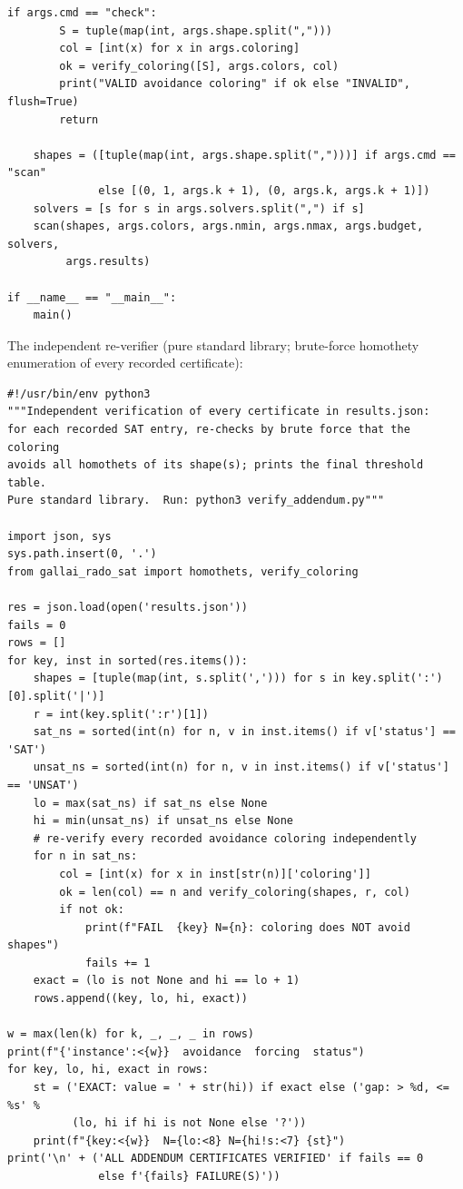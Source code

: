 \documentclass[12pt]{article}
\begin{document}
\begin{lstlisting}[style=plainstyle]
    if args.cmd == "check":
        S = tuple(map(int, args.shape.split(",")))
        col = [int(x) for x in args.coloring]
        ok = verify_coloring([S], args.colors, col)
        print("VALID avoidance coloring" if ok else "INVALID", flush=True)
        return

    shapes = ([tuple(map(int, args.shape.split(",")))] if args.cmd == "scan"
              else [(0, 1, args.k + 1), (0, args.k, args.k + 1)])
    solvers = [s for s in args.solvers.split(",") if s]
    scan(shapes, args.colors, args.nmin, args.nmax, args.budget, solvers,
         args.results)

if __name__ == "__main__":
    main()
\end{lstlisting}

The independent re-verifier (pure standard library; brute-force
homothety enumeration of every recorded certificate):

\begin{lstlisting}[style=plainstyle]
#!/usr/bin/env python3
"""Independent verification of every certificate in results.json:
for each recorded SAT entry, re-checks by brute force that the coloring
avoids all homothets of its shape(s); prints the final threshold table.
Pure standard library.  Run: python3 verify_addendum.py"""

import json, sys
sys.path.insert(0, '.')
from gallai_rado_sat import homothets, verify_coloring

res = json.load(open('results.json'))
fails = 0
rows = []
for key, inst in sorted(res.items()):
    shapes = [tuple(map(int, s.split(','))) for s in key.split(':')[0].split('|')]
    r = int(key.split(':r')[1])
    sat_ns = sorted(int(n) for n, v in inst.items() if v['status'] == 'SAT')
    unsat_ns = sorted(int(n) for n, v in inst.items() if v['status'] == 'UNSAT')
    lo = max(sat_ns) if sat_ns else None
    hi = min(unsat_ns) if unsat_ns else None
    # re-verify every recorded avoidance coloring independently
    for n in sat_ns:
        col = [int(x) for x in inst[str(n)]['coloring']]
        ok = len(col) == n and verify_coloring(shapes, r, col)
        if not ok:
            print(f"FAIL  {key} N={n}: coloring does NOT avoid shapes")
            fails += 1
    exact = (lo is not None and hi == lo + 1)
    rows.append((key, lo, hi, exact))

w = max(len(k) for k, _, _, _ in rows)
print(f"{'instance':<{w}}  avoidance  forcing  status")
for key, lo, hi, exact in rows:
    st = ('EXACT: value = ' + str(hi)) if exact else ('gap: > %d, <= %s' %
          (lo, hi if hi is not None else '?'))
    print(f"{key:<{w}}  N={lo:<8} N={hi!s:<7} {st}")
print('\n' + ('ALL ADDENDUM CERTIFICATES VERIFIED' if fails == 0
              else f'{fails} FAILURE(S)'))
\end{lstlisting}
\end{document}

